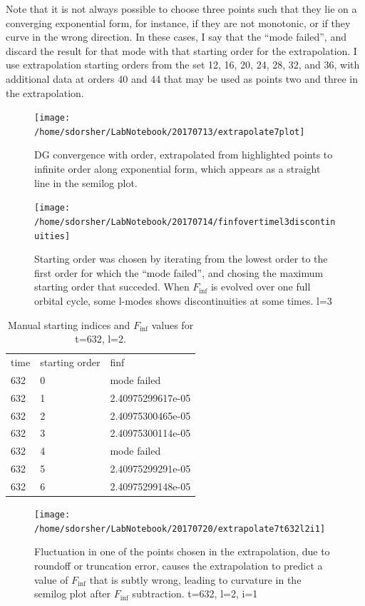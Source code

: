 Note that it is not always possible to choose three points such that they lie on a converging exponential form, for instance, if they are not monotonic, or if they curve in the wrong direction. In these cases, I say that the ``mode failed'', and discard the result for that mode with that starting order for the extrapolation. I use extrapolation starting orders from the set 12, 16, 20, 24, 28, 32, and 36, with additional data at orders 40 and 44 that may be used as points two and three in the extrapolation. 

\begin{figure}
\texttt{[image: /home/sdorsher/LabNotebook/20170713/extrapolate7plot]}
\caption{DG convergence with order, extrapolated from highlighted points to infinite order along exponential form, which appears as a straight line in the semilog plot.}
\end{figure}



\begin{figure}
  \texttt{[image: /home/sdorsher/LabNotebook/20170714/finfovertimel3discontinuities]}
  \caption{Starting order was chosen by iterating from the lowest order to the first order for which the ``mode failed'', and chosing the maximum starting order that succeded. When $F_{\inf}$ is evolved over one full orbital cycle, some l-modes shows discontinuities at some times. l=3}
\end{figure}




\begin{table}
  \begin{tabular}{lll}
    time & starting order & finf\\
    632 & 0 & mode failed\\
    632 & 1 & 2.40975299617e-05\\
    632 & 2 & 2.40975300465e-05\\
    632 & 3 & 2.40975300114e-05\\
    632 & 4 & mode failed\\
    632 & 5 & 2.40975299291e-05\\
    632 & 6 & 2.40975299148e-05\\
  \end{tabular}
  \caption{Manual starting indices and $F_{\inf}$ values for t=632, l=2.}
  \label{manual}
\end{table}

\begin{figure}
  \texttt{[image: /home/sdorsher/LabNotebook/20170720/extrapolate7t632l2i1]}
  \caption{Fluctuation in one of the points chosen in the extrapolation, due to roundoff or truncation error, causes the extrapolation to predict a value of $F_{\inf}$ that is subtly wrong, leading to curvature in the semilog plot after $F_{\inf}$ subtraction. t=632, l=2, i=1}
\end{figure}

